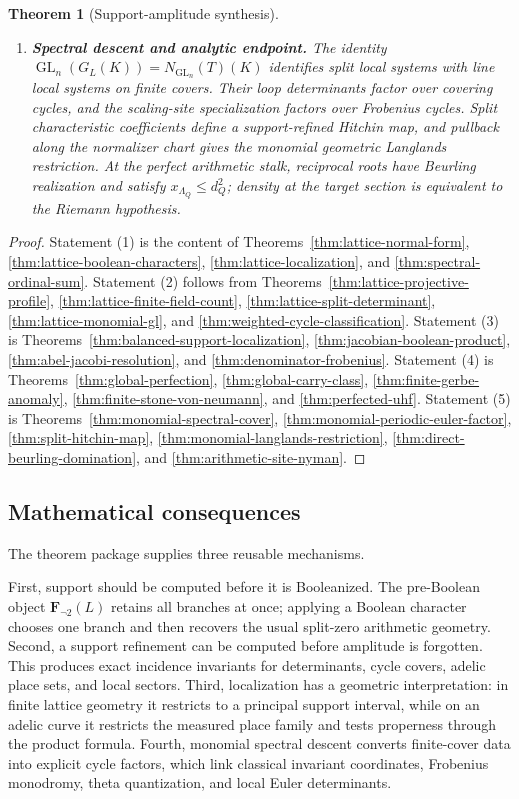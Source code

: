 \documentclass[11pt]{amsart}
\numberwithin{equation}{section}
\newtheorem{theorem}{Theorem}[section]
\theoremstyle{definition}
\newcommand{\Fnot}{\mathbf F_{\neg 2}}
\newcommand{\GL}{\operatorname{GL}}
\begin{document}
\begin{theorem}[Support-amplitude synthesis]
\begin{enumerate}[label=\textup{(\arabic*)},leftmargin=3.2em]
\item \textbf{Spectral descent and analytic endpoint.}
The identity
$\GL_n(G_L(K))=N_{\GL_n}(T)(K)$ identifies split local systems with line
local systems on finite covers.  Their loop determinants factor over
covering cycles, and the scaling-site specialization factors over
Frobenius cycles.  Split characteristic coefficients define a
support-refined Hitchin map, and pullback along the normalizer chart gives
the monomial geometric Langlands restriction.  At the perfect arithmetic
stalk, reciprocal roots have Beurling realization and satisfy
$x_{\Lambda_Q}\le d_Q^2$; density at the target section is equivalent to
the Riemann hypothesis.
\end{enumerate}
\end{theorem}

\begin{proof}
Statement (1) is the content of
Theorems~\ref{thm:lattice-normal-form},
\ref{thm:lattice-boolean-characters},
\ref{thm:lattice-localization}, and
\ref{thm:spectral-ordinal-sum}.  Statement (2) follows from
Theorems~\ref{thm:lattice-projective-profile},
\ref{thm:lattice-finite-field-count},
\ref{thm:lattice-split-determinant},
\ref{thm:lattice-monomial-gl}, and
\ref{thm:weighted-cycle-classification}.  Statement (3) is
Theorems~\ref{thm:balanced-support-localization},
\ref{thm:jacobian-boolean-product},
\ref{thm:abel-jacobi-resolution}, and
\ref{thm:denominator-frobenius}.  Statement (4) is
Theorems~\ref{thm:global-perfection},
\ref{thm:global-carry-class},
\ref{thm:finite-gerbe-anomaly},
\ref{thm:finite-stone-von-neumann}, and
\ref{thm:perfected-uhf}.  Statement (5) is
Theorems~\ref{thm:monomial-spectral-cover},
\ref{thm:monomial-periodic-euler-factor},
\ref{thm:split-hitchin-map},
\ref{thm:monomial-langlands-restriction},
\ref{thm:direct-beurling-domination}, and
\ref{thm:arithmetic-site-nyman}.
\end{proof}

\subsection*{Mathematical consequences}

The theorem package supplies three reusable mechanisms.

First, support should be computed before it is Booleanized.  The
pre-Boolean object $\Fnot(L)$ retains all branches at once; applying a
Boolean character chooses one branch and then recovers the usual
split-zero arithmetic geometry.  Second, a support refinement can be
computed before amplitude is forgotten.
This produces exact incidence invariants for determinants, cycle covers,
adelic place sets, and local sectors.  Third, localization has a geometric
interpretation: in finite lattice geometry it restricts to a principal
support interval, while on an adelic curve it restricts the measured place
family and tests properness through the product formula.  Fourth, monomial
spectral descent converts finite-cover data into explicit cycle factors,
which link classical invariant coordinates, Frobenius monodromy, theta
quantization, and local Euler determinants.
\end{document}
